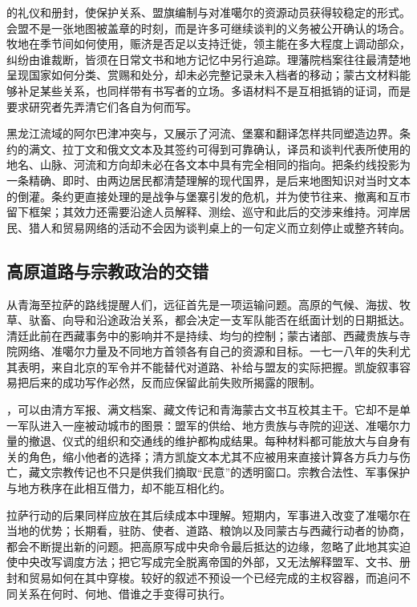 的礼仪和册封，使保护关系、盟旗编制与对准噶尔的资源动员获得较稳定的形式。会盟不是一张地图被盖章的时刻，而是许多可继续谈判的义务被公开确认的场合。牧地在季节间如何使用，赈济是否足以支持迁徙，领主能在多大程度上调动部众，纠纷由谁裁断，皆须在日常文书和地方记忆中另行追踪。理藩院档案往往最清楚地呈现国家如何分类、赏赐和处分，却未必完整记录未入档者的移动；蒙古文材料能够补足某些关系，也同样带有书写者的立场。多语材料不是互相抵销的证词，而是要求研究者先弄清它们各自为何而写。

黑龙江流域的阿尔巴津冲突与，又展示了河流、堡寨和翻译怎样共同塑造边界。条约的满文、拉丁文和俄文文本及其签约可得到可靠确认，译员和谈判代表所使用的地名、山脉、河流和方向却未必在各文本中具有完全相同的指向。把条约线投影为一条精确、即时、由两边居民都清楚理解的现代国界，是后来地图知识对当时文本的倒灌。条约更直接处理的是战争与堡寨引发的危机，并为使节往来、撤离和互市留下框架；其效力还需要沿途人员解释、测绘、巡守和此后的交涉来维持。河岸居民、猎人和贸易网络的活动不会因为谈判桌上的一句定义而立刻停止或整齐转向。

\subsection*{高原道路与宗教政治的交错}
从青海至拉萨的路线提醒人们，远征首先是一项运输问题。高原的气候、海拔、牧草、驮畜、向导和沿途政治关系，都会决定一支军队能否在纸面计划的日期抵达。清廷此前在西藏事务中的影响并不是持续、均匀的控制；蒙古诸部、西藏贵族与寺院网络、准噶尔力量及不同地方首领各有自己的资源和目标。一七一八年的失利尤其表明，来自北京的军令并不能替代对道路、补给与盟友的实际把握。凯旋叙事容易把后来的成功写作必然，反而应保留此前失败所揭露的限制。

，可以由清方军报、满文档案、藏文传记和青海蒙古文书互校其主干。它却不是单一军队进入一座被动城市的图景：盟军的供给、地方贵族与寺院的迎送、准噶尔力量的撤退、仪式的组织和交通线的维护都构成结果。每种材料都可能放大与自身有关的角色，缩小他者的选择；清方凯旋文本尤其不应被用来直接计算各方兵力与伤亡，藏文宗教传记也不只是供我们摘取“民意”的透明窗口。宗教合法性、军事保护与地方秩序在此相互借力，却不能互相化约。

拉萨行动的后果同样应放在其后续成本中理解。短期内，军事进入改变了准噶尔在当地的优势；长期看，驻防、使者、道路、粮饷以及同蒙古与西藏行动者的协商，都会不断提出新的问题。把高原写成中央命令最后抵达的边缘，忽略了此地其实迫使中央改写调度方法；把它写成完全脱离帝国的外部，又无法解释盟军、文书、册封和贸易如何在其中穿梭。较好的叙述不预设一个已经完成的主权容器，而追问不同关系在何时、何地、借谁之手变得可执行。

